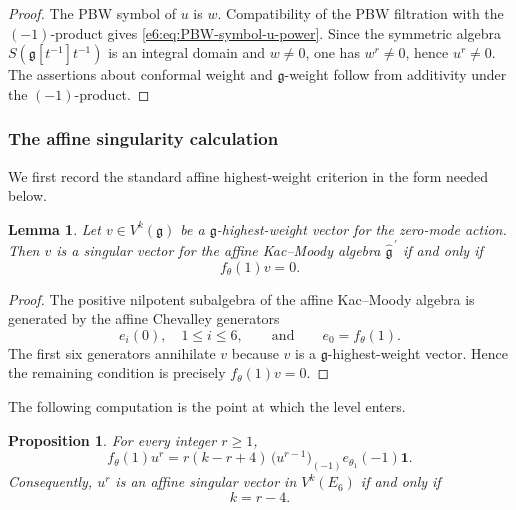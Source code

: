 \documentclass[11pt,reqno]{amsart}
\newtheorem{lemma}[theorem]{Lemma}
\newtheorem{proposition}[theorem]{Proposition}
\theoremstyle{definition}
\theoremstyle{remark}
\begin{document}
\begin{proof}
The PBW symbol of $u$ is $w$.  Compatibility of the PBW filtration with the
$(-1)$-product gives \eqref{e6:eq:PBW-symbol-u-power}.  Since the symmetric algebra
$S(\mathfrak g[t^{-1}]t^{-1})$ is an integral domain and $w\neq0$, one has
$w^r\neq0$, hence $u^r\neq0$.  The assertions about conformal weight and
$\mathfrak g$-weight follow from additivity under the $(-1)$-product.
\end{proof}

\subsubsection{The affine singularity calculation}


We first record the standard affine highest-weight criterion in the form needed
below.

\begin{lemma}\label{e6:lem:affine-singularity-criterion}
Let $v\in V^k(\mathfrak g)$ be a $\mathfrak g$-highest-weight vector for the
zero-mode action.  Then $v$ is a singular vector for the affine Kac--Moody algebra
$\widehat{\mathfrak g}^{\,\prime}$ if and only if
\[
  f_\theta(1)v=0.
\]
\end{lemma}

\begin{proof}
The positive nilpotent subalgebra of the affine Kac--Moody algebra is generated
by the affine Chevalley generators
\[
  e_i(0),\quad 1\leq i\leq6,
  \qquad\text{and}\qquad
  e_0=f_\theta(1).
\]
The first six generators annihilate $v$ because $v$ is a
$\mathfrak g$-highest-weight vector.  Hence the remaining condition is precisely
$f_\theta(1)v=0$.
\end{proof}

The following computation is the point at which the level enters.

\begin{proposition}\label{e6:prop:f-theta-on-u-powers}
For every integer $r\geq1$,
\begin{equation}\label{e6:eq:f-theta-on-u-powers}
  f_\theta(1)u^r
  =r(k-r+4)\,
   \bigl(u^{r-1}\bigr)_{(-1)}e_{\theta_1}(-1)\mathbf1.
\end{equation}
Consequently, $u^r$ is an affine singular vector in $V^k(E_6)$ if and only if
\begin{equation}\label{e6:eq:singular-level-for-r}
  k=r-4.
\end{equation}
\end{proposition}
\end{document}
